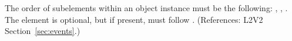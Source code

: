 The order of subelements within an \Event object instance must be
the following: , ,
.  The  element is
optional, but if present, must follow .
(References: L2V2 Section~\ref{sec:events}.)
